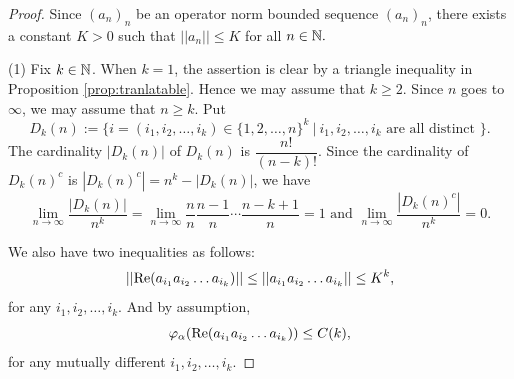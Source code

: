 \documentclass[a4paper,12pt]{amsart}
\begin{document}
\begin{proof}
Since  $(a_n)_n$ be an operator norm bounded sequence $(a_n)_n$, there exists a constant $K > 0$ such that 
$||a_n||\leq K$ for all $n \in {\Bbb N}.$ 

(1)  Fix $k \in {\Bbb N}$. When $k = 1$, the assertion is clear by a triangle inequality in Proposition \ref{prop:tranlatable}. Hence we may assume that $k \geq 2.$ 
Since $n$ goes to $\infty$, we may assume that $n \geq k$.
Put 
$$
D_k(n) := \{i = (i_1,i_2,\dots,i_k) \in \{1,2,\dots,n\}^k \ | \  i_1,i_2,\dots,i_k \text{  are all distinct } \} .
$$
The cardinality $|D_k(n)|$ of $D_k(n)$ is $\dfrac{n!}{(n-k)!}$. 
Since the cardinality of $D_k(n)^c$ is $|D_k(n)^c|=n^k-|D_k(n)|$, we have
\[  \lim_{n\to\infty} \frac{|D_k(n)|}{n^k} = \lim_{n\to\infty}\frac{n}{n}\frac{n-1}{n}\cdots\frac{n-k+1}{n} = 1  
\text{ and } \lim_{n\to\infty} \frac{|D_k(n)^c|}{n^k}= 0.  \]

We also have two inequalities as follows:
$$
|| {\rm Re}(a_{i_1}a_{i_2} \dots a_{i_k}) || \leq ||  a_{i_1}a_{i_2} \dots a_{i_k}    || \leq K^k, 
$$
for any $i_1, i_2, \dots, i_k$.  And by assumption, 
$$
\varphi_{\alpha}({\rm Re} (a_{i_1}a_{i_2} \dots a_{i_k})) \leq C(k), 
$$
for any mutually different $i_1, i_2, \dots, i_k$. 


\end{proof}
\end{document}
